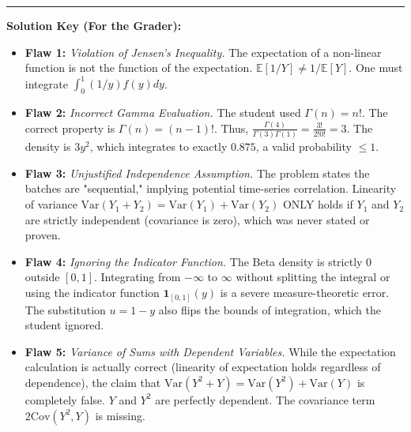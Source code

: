 \documentclass[11pt, a4paper]{article}
\theoremstyle{definition}
\theoremstyle{remark}
\newcommand{\E}{\mathbb{E}}
\begin{document}
\vspace{1cm}
\hrule
\vspace{0.5cm}
\textbf{Solution Key (For the Grader):}
\begin{itemize}
    \item \textbf{Flaw 1:} \textit{Violation of Jensen's Inequality.} The expectation of a non-linear function is not the function of the expectation. $\E[1/Y] \neq 1/\E[Y]$. One must integrate $\int_0^1 (1/y) f(y) dy$.
    \item \textbf{Flaw 2:} \textit{Incorrect Gamma Evaluation.} The student used $\Gamma(n) = n!$. The correct property is $\Gamma(n) = (n-1)!$. Thus, $\frac{\Gamma(4)}{\Gamma(3)\Gamma(1)} = \frac{3!}{2!0!} = 3$. The density is $3y^2$, which integrates to exactly $0.875$, a valid probability $\le 1$.
    \item \textbf{Flaw 3:} \textit{Unjustified Independence Assumption.} The problem states the batches are "sequential," implying potential time-series correlation. Linearity of variance $\text{Var}(Y_1 + Y_2) = \text{Var}(Y_1) + \text{Var}(Y_2)$ ONLY holds if $Y_1$ and $Y_2$ are strictly independent (covariance is zero), which was never stated or proven.
    \item \textbf{Flaw 4:} \textit{Ignoring the Indicator Function.} The Beta density is strictly $0$ outside $[0,1]$. Integrating from $-\infty$ to $\infty$ without splitting the integral or using the indicator function $\mathbf{1}_{[0,1]}(y)$ is a severe measure-theoretic error. The substitution $u = 1-y$ also flips the bounds of integration, which the student ignored.
    \item \textbf{Flaw 5:} \textit{Variance of Sums with Dependent Variables.} While the expectation calculation is actually correct (linearity of expectation holds regardless of dependence), the claim that $\text{Var}(Y^2 + Y) = \text{Var}(Y^2) + \text{Var}(Y)$ is completely false. $Y$ and $Y^2$ are perfectly dependent. The covariance term $2\text{Cov}(Y^2, Y)$ is missing.
\end{itemize}
\end{document}
